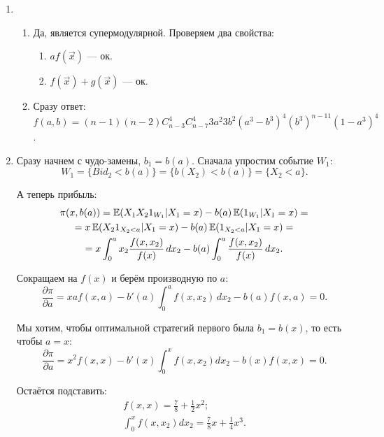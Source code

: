 \begin{enumerate}

\item
\begin{enumerate}
\item Да, является супермодулярной. Проверяем два свойства:
\begin{enumerate}
\item $ af(\vec{x}) $ — ок.
\item $ f(\vec{x})+g(\vec{x}) $ — ок.
\end{enumerate}

\item Сразу ответ: $ f(a,b)=(n-1)(n-2)C_{n-3}^{4}C_{n-7}^{4}3a^{2}3b^{2}(a^{3}-b^{3})^{4}(b^{3})^{n-11}(1-a^{3})^{4} $.
\end{enumerate}


\item Сразу начнем с чудо-замены, $ b_{1}=b(a) $. Сначала упростим событие $ W_{1} $:
\begin{equation}
W_{1}=\{Bid_{2}<b(a)\}=\{b(X_{2})<b(a)\}=\{X_{2}<a\}.
\end{equation}

А теперь прибыль:
\begin{multline}
\pi(x,b(a))=\operatorname{\mathbb{E}}(X_{1}X_{2}1_{W_{1}}|X_{1}=x)-b(a)\operatorname{\mathbb{E}}(1_{W_{1}}|X_{1}=x)=\\
=x\operatorname{\mathbb{E}}(X_{2}1_{X_{2}<a}|X_{1}=x)-b(a)\operatorname{\mathbb{E}}(1_{X_{2}<a}|X_{1}=x)=\\
=x\int_{0}^{a}x_{2}\frac{f(x,x_{2})}{f(x)} \, dx_{2}-b(a)\int_{0}^{a}\frac{f(x,x_{2})}{f(x)} \, dx_{2}.
\end{multline}


Сокращаем на $ f(x) $ и берём производную по $ a $:
\begin{equation}
\frac{\partial \pi}{\partial a}=xaf(x,a)-b'(a)\int_{0}^{a}f(x,x_{2}) \, dx_{2}-b(a)f(x,a)=0.
\end{equation}


Мы хотим, чтобы оптимальной стратегий первого была $ b_{1}=b(x) $, то есть чтобы $ a=x $:
\begin{equation}
\frac{\partial \pi}{\partial a}=x^{2}f(x,x)-b'(x)\int_{0}^{x}f(x,x_{2})dx_{2}-b(x)f(x,x)=0.
\end{equation}

Остаётся подставить:
\begin{equation}
\begin{array}{c}
f(x,x)=\frac{7}{8}+\frac{1}{2}x^{2}; \\
\int_{0}^{x}f(x,x_{2})dx_{2}=\frac{7}{8}x+\frac{1}{4}x^{3}.
\end{array}
\end{equation}



\end{enumerate}

